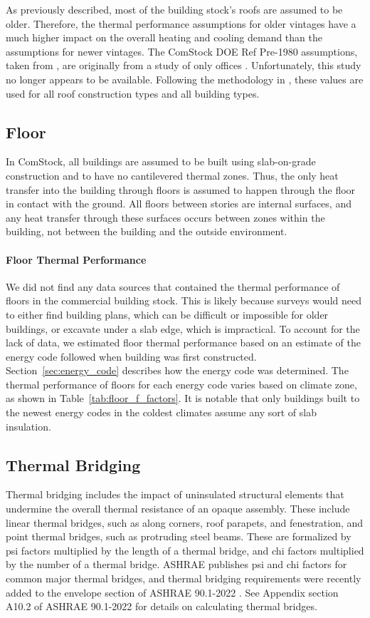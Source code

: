 As previously described, most of the building stock's roofs are assumed to be older. Therefore, the thermal performance assumptions for older vintages have a much higher impact on the overall heating and cooling demand than the assumptions for newer vintages. The ComStock DOE Ref Pre-1980 assumptions, taken from \cite{doe_reference_buildings}, are originally from a study of only offices \citep{old_vintage_office_study}. Unfortunately, this study no longer appears to be available. Following the methodology in \cite{doe_reference_buildings}, these values are used for all roof construction types and all building types.


\subsection{Floor}
In ComStock, all buildings are assumed to be built using slab-on-grade construction and to have no cantilevered thermal zones. Thus, the only heat transfer into the building through floors is assumed to happen through the floor in contact with the ground. All floors between stories are internal surfaces, and any heat transfer through these surfaces occurs between zones within the building, not between the building and the outside environment.

\paragraph{Floor Thermal Performance}
We did not find any data sources that contained the thermal performance of floors in the commercial building stock. This is likely because surveys would need to either find building plans, which can be difficult or impossible for older buildings, or excavate under a slab edge, which is impractical. To account for the lack of data, we estimated floor thermal performance based on an estimate of the energy code followed when building was first constructed. Section~\ref{sec:energy_code} describes how the energy code was determined. The thermal performance of floors for each energy code varies based on climate zone, as shown in Table~\ref{tab:floor_f_factors}. It is notable that only buildings built to the newest energy codes in the coldest climates assume any sort of slab insulation.

\subsection{Thermal Bridging} %
Thermal bridging includes the impact of uninsulated structural elements that undermine the overall thermal resistance of an opaque assembly. These include linear thermal bridges, such as along corners, roof parapets, and fenestration, and point thermal bridges, such as protruding steel beams. These are formalized by psi factors multiplied by the length of a thermal bridge, and chi factors multiplied by the number of a thermal bridge. ASHRAE publishes psi and chi factors for common major thermal bridges, and thermal bridging requirements were recently added to the envelope section of ASHRAE 90.1-2022 \citep{ashrae_901_2022}. See Appendix section A10.2 of ASHRAE 90.1-2022 for details on calculating thermal bridges.

